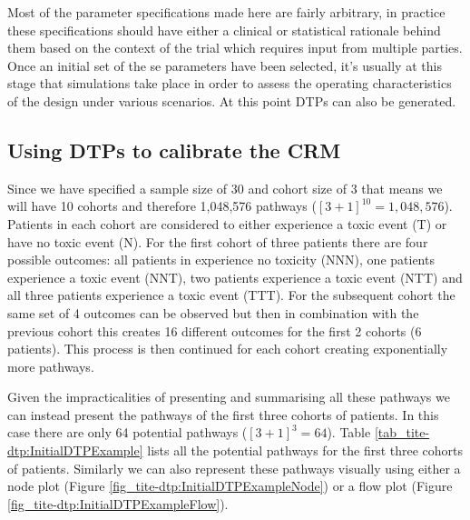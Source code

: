 Most of the parameter specifications made here are fairly arbitrary, in practice these specifications should have either a clinical or statistical rationale behind them based on the context of the trial which requires input from multiple parties. Once an initial set of the se parameters have been selected, it's usually at this stage that simulations take place in order to assess the operating characteristics of the design under various scenarios. At this point DTPs can also be generated. 

\subsection{Using DTPs to calibrate the CRM}

Since we have specified a sample size of 30 and cohort size of 3 that means we will have 10 cohorts and therefore 1,048,576 pathways ($[3+1]^{10} = 1,048,576$). Patients in each cohort are considered to either experience a toxic event (T) or have no toxic event (N). For the first cohort of three patients there are four possible outcomes: all patients in experience no toxicity (NNN), one patients experience a toxic event (NNT), two patients experience a toxic event (NTT) and all three patients experience a toxic event (TTT). For the subsequent cohort the same set of 4 outcomes can be observed but then in combination with the previous cohort this creates 16 different outcomes for the first 2 cohorts (6 patients). This process is then continued for each cohort creating exponentially more pathways. 

Given the impracticalities of presenting and summarising all these pathways we can instead present the pathways of the first three cohorts of patients. In this case there are only 64 potential pathways ($[3+1]^{3} = 64$). Table \ref{tab_tite-dtp:InitialDTPExample} lists all the potential pathways for the first three cohorts of patients. Similarly we can also represent these pathways visually using either a node plot (Figure \ref{fig_tite-dtp:InitialDTPExampleNode}) or a flow plot (Figure \ref{fig_tite-dtp:InitialDTPExampleFlow}).


